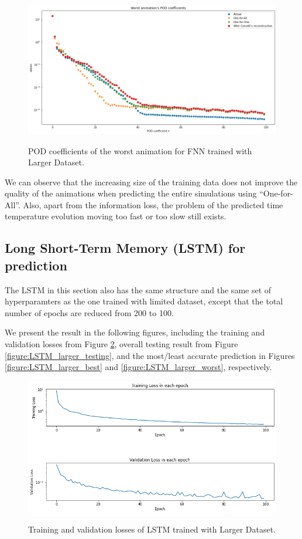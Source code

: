 \begin{figure}[H]
    \centering
    \caption{POD coefficients of the worst animation for FNN trained with Larger Dataset.}
    \includegraphics[scale=0.4]{figures/mantle_convection_images/larger_dataset/FNN_Worst_POD.png}
    \label{figure:FNN_larger_worst_POD}
\end{figure}

We can observe that the increasing size of the training data does not improve the quality of the animations when predicting the entire simulations using ``One-for-All''. Also, apart from the information loss, the problem of the predicted time temperature evolution moving too fast or too slow still exists.


\subsection{Long Short-Term Memory (LSTM) for prediction}

The LSTM in this section also has the same structure and the same set of hyperparamters as the one trained with limited dataset, except that the total number of epochs are reduced from 200 to 100.

We present the result in the following figures, including the training and validation losses from Figure \ref{figure:LSTM_larger_losses}, overall testing result from Figure \ref{figure:LSTM_larger_testing}, and the most/least accurate prediction in Figures \ref{figure:LSTM_larger_best} and \ref{figure:LSTM_larger_worst}, respectively.

\begin{figure}[H]
    \caption{Training and validation losses of LSTM trained with Larger Dataset.}
    \includegraphics[scale=0.6]{figures/mantle_convection_images/larger_dataset/LSTM_trainingData.png}
    \label{figure:LSTM_larger_losses}
\end{figure}

